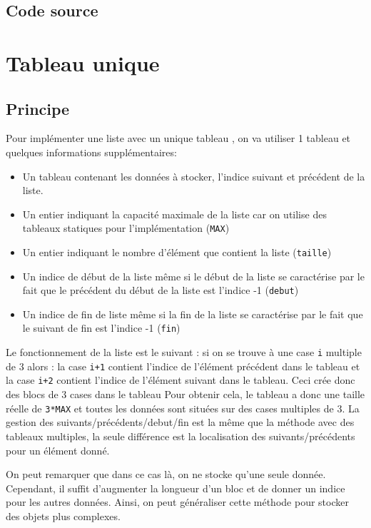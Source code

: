 \documentclass{report}
\newcommand{\code}{\lstinline[style=customjava]}
\begin{document}
      \subsection{Code source}
        
        
    \section{Tableau unique}
      \subsection{Principe}
        Pour implémenter une liste avec un unique tableau , on va utiliser 1 tableau et quelques informations supplémentaires: 
        \begin{itemize}
          \item Un tableau contenant les données à stocker, l'indice suivant et précédent de la liste.
          \item Un entier indiquant la capacité maximale de la liste car on utilise des tableaux statiques pour l'implémentation (\code{MAX})
          \item Un entier indiquant le nombre d'élément que contient la liste (\code{taille})
          \item Un indice de début de la liste même si le début de la liste se caractérise par le fait que le précédent du début de la liste est l'indice -1 (\code{debut})
          \item Un indice de fin de liste même si la fin de la liste se caractérise par le fait que le suivant de fin est l'indice -1 (\code{fin})
        \end{itemize}
        Le fonctionnement de la liste est le suivant : si on se trouve à une case \code{i} multiple de 3 alors : la case \code{i+1} contient l'indice de l'élément précédent dans le tableau et la case \code{i+2} contient l'indice de l'élément suivant dans le tableau. Ceci crée donc des blocs de 3 cases dans le tableau
        Pour obtenir cela, le tableau a donc une taille réelle de \code{3*MAX} et toutes les données sont situées sur des cases multiples de 3.
        La gestion des suivants/précédents/debut/fin est la même que la méthode avec des tableaux multiples, la seule différence est la localisation des suivants/précédents pour un élément donné.
        
        On peut remarquer que dans ce cas là, on ne stocke qu'une seule donnée. Cependant, il suffit d'augmenter la longueur d'un bloc et de donner un indice pour les autres données. Ainsi, on peut généraliser cette méthode pour stocker des objets plus complexes.
        
\end{document}
